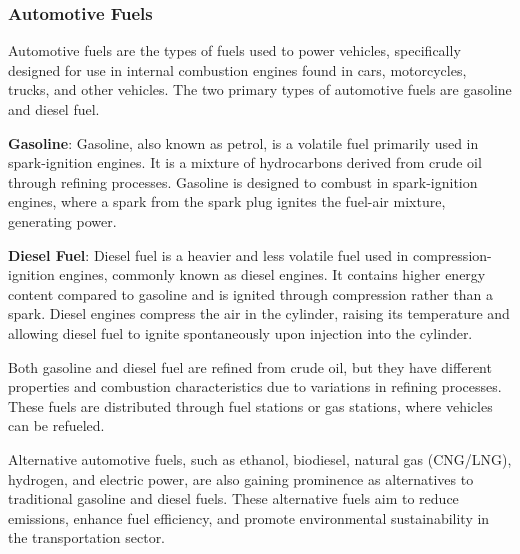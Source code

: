 \documentclass{article}
\begin{document}
\subsubsection*{Automotive Fuels}
Automotive fuels are the types of fuels used to power vehicles, specifically designed for use in internal combustion engines found in cars, motorcycles, trucks, and other vehicles. The two primary types of automotive fuels are gasoline and diesel fuel.

\textbf{Gasoline}: Gasoline, also known as petrol, is a volatile fuel primarily used in spark-ignition engines. It is a mixture of hydrocarbons derived from crude oil through refining processes. Gasoline is designed to combust in spark-ignition engines, where a spark from the spark plug ignites the fuel-air mixture, generating power.

\textbf{Diesel Fuel}: Diesel fuel is a heavier and less volatile fuel used in compression-ignition engines, commonly known as diesel engines. It contains higher energy content compared to gasoline and is ignited through compression rather than a spark. Diesel engines compress the air in the cylinder, raising its temperature and allowing diesel fuel to ignite spontaneously upon injection into the cylinder.

Both gasoline and diesel fuel are refined from crude oil, but they have different properties and combustion characteristics due to variations in refining processes. These fuels are distributed through fuel stations or gas stations, where vehicles can be refueled.

Alternative automotive fuels, such as ethanol, biodiesel, natural gas (CNG/LNG), hydrogen, and electric power, are also gaining prominence as alternatives to traditional gasoline and diesel fuels. These alternative fuels aim to reduce emissions, enhance fuel efficiency, and promote environmental sustainability in the transportation sector.
\end{document}
